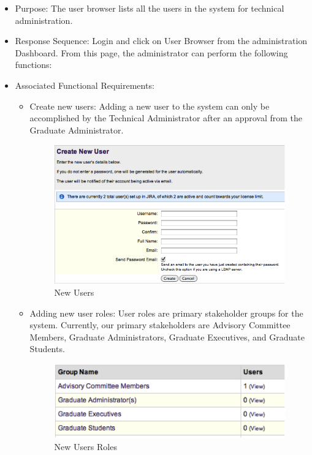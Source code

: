 \documentclass{journal}
\begin{document}
\begin{itemize}
\item Purpose: The user browser lists all the users in the system for technical administration. 
\item Response Sequence: Login and click on User Browser from the administration Dashboard. From this page, the administrator can perform the following functions:
\item Associated Functional Requirements:
\begin{itemize}
\item Create new users: Adding a new user to the system can only be accomplished by the Technical Administrator after an approval from the Graduate Administrator. 
\begin{figure}[htp]
\centering
\includegraphics[scale=1]{diagrams/HTMLTemplating/Figure8.png}
\caption{New Users}
\label{fig:NewUser}
\end{figure}
\item Adding new user roles: User roles are primary stakeholder groups for the system. Currently, our primary stakeholders are Advisory Committee Members, Graduate Administrators, Graduate Executives, and Graduate Students.
\begin{figure}[htp]
\centering
\includegraphics[scale=1]{diagrams/HTMLTemplating/Figure9.png}
\caption{New Users Roles}
\label{fig:NewUserRoles}
\end{figure}


\end{itemize}
\end{itemize}
\end{document}
